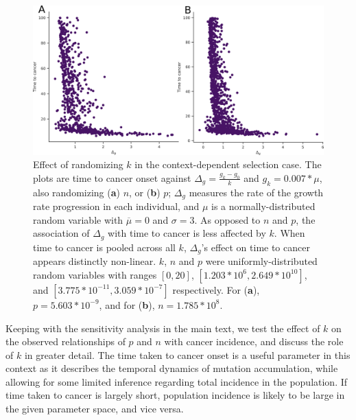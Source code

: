 \documentclass[12pt,onecolumn,twoside]{article}
\begin{document}
		\begin{figure}[tbhp]
			\centering
			\includegraphics[width=\linewidth, keepaspectratio=true]{figS2-2.png}
			\caption{Effect of randomizing $k$ in the context-dependent selection case. The plots are time to cancer onset against $\Delta_{g} = \frac{g_{k}-g_{0}}{k}$ and $g_{k} = 0.007*\mu$, also randomizing (\textbf{a}) $n$, or (\textbf{b}) $p$; $\Delta_{g}$ measures the rate of the growth rate progression in each individual, and $\mu$ is a normally-distributed random variable with $\overline{\mu}=0$ and $\sigma=3$. As opposed to $n$ and $p$, the association of $\Delta_{g}$ with time to cancer is less affected by $k$. When time to cancer is pooled across all $k$, $\Delta_{g}$'s effect on time to cancer appears distinctly non-linear. $k$, $n$ and $p$ were uniformly-distributed random variables with ranges $[0, 20]$, $[1.203*10^{6}, 2.649*10^{10}]$, and $[3.775*10^{-11}, 3.059*10^{-7}]$ respectively. For (\textbf{a}), $p=5.603*10^{-9}$, and for (\textbf{b}), $n=1.785*10^{8}$.}
			\label{figS2.2}
		\end{figure}

		Keeping with the sensitivity analysis in the main text, we test the effect of $k$ on the observed relationships of $p$ and $n$ with cancer incidence, and discuss the role of $k$ in greater detail. The time taken to cancer onset is a useful parameter in this context as it describes the temporal dynamics of mutation accumulation, while allowing for some limited inference regarding total incidence in the population. If time taken to cancer is largely short, population incidence is likely to be large in the given parameter space, and vice versa.
\end{document}
